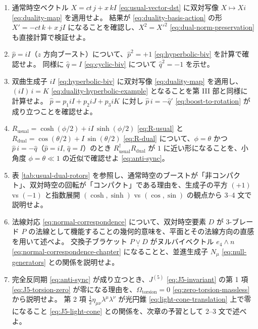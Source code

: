 \documentclass[dvipdfmx,a4paper,oneside]{jsbook}
\numberwithin{equation}{chapter}
\begin{document}
\begin{enumerate}[leftmargin=2em]
  \item 通常時空ベクトル \(X = ct\, j + x\, kI\) \eqref{eq:usual-vector-dst} に双対写像 \(X \mapsto Xi\) \eqref{eq:duality-map} を適用せよ。
  結果が \eqref{eq:duality-basis-action} の形 \(X' = -ct\, k + x\, jI\) になることを確認し、\(X^2 = X'^2\) \eqref{eq:dual-norm-preservation} も直接計算で検証せよ。

  \item \(\hat{p} = iI\)（\(z\) 方向ブースト）について、\(\hat{p}^2 = +1\) \eqref{eq:hyperbolic-biv} を計算で確認せよ。
  同様に \(\hat{q} = I\) \eqref{eq:cyclic-biv} について \(\hat{q}^2 = -1\) を示せ。

  \item 双曲生成子 \(iI\) \eqref{eq:hyperbolic-biv} に双対写像 \eqref{eq:duality-map} を適用し、\((iI)\, i = K\) \eqref{eq:duality-hyperbolic-example} となることを第 III 部と同様に計算せよ。
  \(\hat{p} = p_1 iI + p_2 iJ + p_3 iK\) に対し \(\hat{p}\, i = -\hat{q}'\) \eqref{eq:boost-to-rotation} が成り立つことを確認せよ。

  \item \(R_{\mathrm{usual}} = \cosh(\phi/2) + iI\,\sinh(\phi/2)\) \eqref{eq:R-usual} と \(R_{\mathrm{dual}} = \cos(\theta/2) + I\,\sin(\theta/2)\) \eqref{eq:R-dual} について、\(\phi = \theta\) かつ \(\hat{p}\, i = -\hat{q}\)（\(\hat{p} = iI\), \(\hat{q} = I\)）のとき \(R_{\mathrm{usual}}^\dagger R_{\mathrm{dual}}\) が \(1\) に近い形になることを、小角度 \(\phi = \theta \ll 1\) の近似で確認せよ \eqref{eq:anti-sync}。

  \item 表 \ref{tab:usual-dual-rotors} を参照し、通常時空のブーストが「非コンパクト」、双対時空の回転が「コンパクト」である理由を、生成子の平方 \((+1)\) vs \((-1)\) と指数展開 \((\cosh,\sinh)\) vs \((\cos,\sin)\) の観点から 3--4 文で説明せよ。

  \item 法線対応 \eqref{eq:normal-correspondence} について、双対時空要素 \(D\) が 3-ブレード \(P\) の法線として機能することの幾何的意味を、平面とその法線方向の直感を用いて述べよ。
  交換子ブラケット \(P \mathbin{\underline{\vee}} D\) がヌルバイベクトル \(e_4 \wedge n\) \eqref{eq:normal-correspondence-chapter} になることと、並進生成子 \(N_\mu\) \eqref{eq:null-generators} との関係を説明せよ。

  \item 完全反同期 \eqref{eq:anti-sync} が成り立つとき、\(J^{(5)}\) \eqref{eq:J5-invariant} の第 1 項 \eqref{eq:J5-torsion-zero} が零になる理由を、\(\Omega_{\mathrm{torsion}} = 0\) \eqref{eq:zero-torsion-massless} から説明せよ。
  第 2 項 \(\tfrac{1}{2}\eta_{\mu\nu}\lambda^\mu\lambda^\nu\) が光円錐 \eqref{eq:light-cone-translation} 上で零になること \eqref{eq:J5-light-cone} との関係を、次章の予習として 2--3 文で述べよ。


\end{enumerate}
\end{document}
